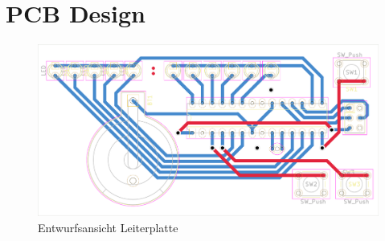 	\chapter{PCB Design}
        \begin{figure}[H]
            \centering
            \includegraphics[width=15cm]{pcb}
            \caption{Entwurfsansicht Leiterplatte}
            \label{fig:pcb-entwurf}
        \end{figure}


